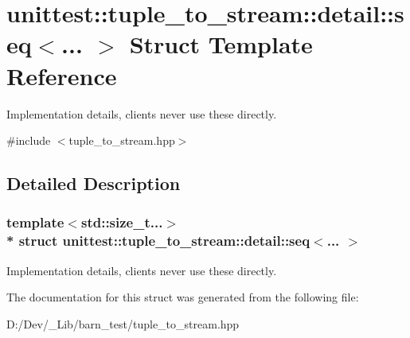 \hypertarget{structunittest_1_1tuple__to__stream_1_1detail_1_1seq}{}\section{unittest\+:\+:tuple\+\_\+to\+\_\+stream\+:\+:detail\+:\+:seq$<$... $>$ Struct Template Reference}
\label{structunittest_1_1tuple__to__stream_1_1detail_1_1seq}


Implementation details, clients never use these directly.  




{\ttfamily \#include $<$tuple\+\_\+to\+\_\+stream.\+hpp$>$}



\subsection{Detailed Description}
\subsubsection*{template$<$std\+::size\+\_\+t...$>$\\*
struct unittest\+::tuple\+\_\+to\+\_\+stream\+::detail\+::seq$<$... $>$}

Implementation details, clients never use these directly. 

The documentation for this struct was generated from the following file\+:\begin{DoxyCompactItemize}
\item 
D\+:/\+Dev/\+\_\+\+Lib/barn\+\_\+test/tuple\+\_\+to\+\_\+stream.\+hpp\end{DoxyCompactItemize}
